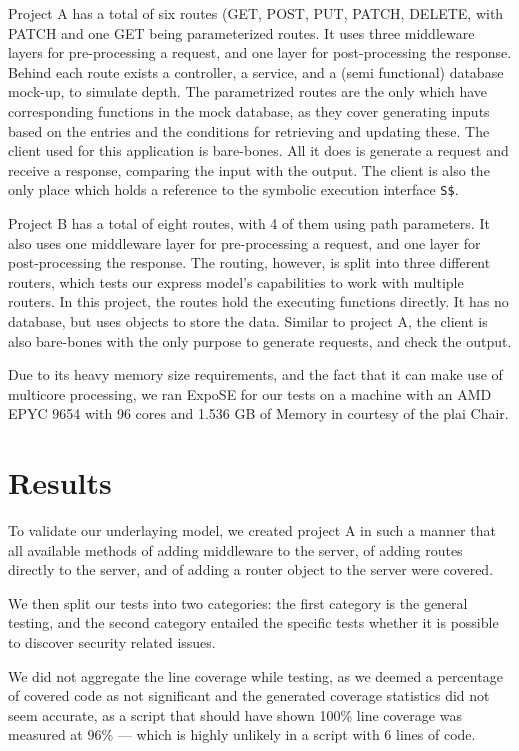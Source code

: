 Project A has a total of six routes (\textsc{GET, POST, PUT, PATCH, DELETE}, with \textsc{PATCH} and one \textsc{GET} being parameterized routes. It uses three middleware layers for pre-processing a request, and one layer for post-processing the response. Behind each route exists a controller, a service, and a (semi functional) database mock-up, to simulate depth. The parametrized routes are the only which have corresponding functions in the mock database, as they cover generating inputs based on the entries and the conditions for retrieving and updating these. The client used for this application is bare-bones. All it does is generate a request and receive a response, comparing the input with the output. The client is also the only place which holds a reference to the symbolic execution interface \lstinline{S$}.

Project B has a total of eight routes, with 4 of them using path parameters.
It also uses one middleware layer for pre-processing a request, and one layer for post-processing the response. The routing, however, is split into three different routers, which tests our express model's capabilities to work with multiple routers. In this project, the routes hold the executing functions directly. It has no database, but uses objects to store the data. Similar to project A, the client is also bare-bones with the only purpose to generate requests, and check the output. 

Due to its heavy memory size requirements, and the fact that it can make use of multicore processing, we ran ExpoSE for our tests on a machine with an AMD EPYC 9654 with 96 cores and 1.536 GB of Memory in courtesy of the \gls{plai} Chair.


\section{Results}
\label{sec:results}

To validate our underlaying model, we created project A in such a manner that all available methods of adding middleware to the server, of adding routes directly to the server, and of adding a router object to the server were covered. 

We then split our tests into two categories: the first category is the general testing, and the second category entailed the specific tests whether it is possible to discover security related issues.


 We did not aggregate the line coverage while testing, as we deemed a percentage of covered code as not significant and the generated coverage statistics did not seem accurate, as a script that should have shown 100\% line coverage was measured at 96\% — which is highly unlikely in a script with 6 lines of code.


